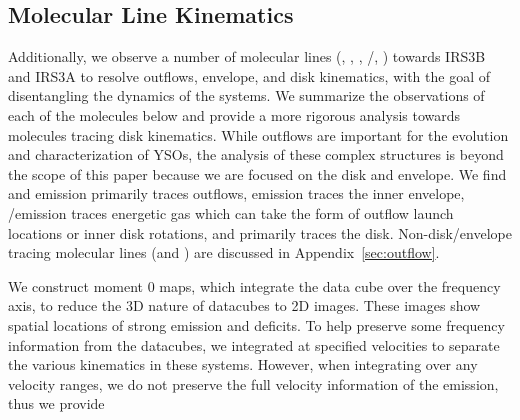 \documentclass[twocolumn, 12pt, trackchanges]{aastex63}
\begin{document}
\subsection{Molecular Line Kinematics}\label{sec:kinematics}
Additionally, we observe a number of molecular lines (\co, \sio, \htcop, \htcn/\sot, \cso) towards IRS3B and IRS3A to resolve outflows, envelope, and disk kinematics, with the goal of disentangling the dynamics of the systems. We summarize the observations of each of the molecules below and provide a more rigorous analysis towards molecules tracing disk kinematics. While outflows are important for the evolution and characterization of YSOs, the analysis of these complex structures is beyond the scope of this paper because we are focused on the disk and envelope. We find \co\space and \sio\space emission primarily traces outflows, \htcop\space emission traces the inner envelope, \htcn/\sot\space emission traces energetic gas which can take the form of outflow launch locations or inner disk rotations, and \cso\space primarily traces the disk. Non-disk/envelope tracing molecular lines (\co\space and \sio) are discussed in Appendix~\ref{sec:outflow}.


We construct moment 0 maps, which integrate the data cube over the frequency axis, to reduce the 3D nature of datacubes to 2D images. These images show spatial locations of strong emission and deficits. To help preserve some frequency information from the datacubes, we integrated at specified velocities to separate the various kinematics in these systems. However, when integrating over any velocity ranges, we do not preserve the full velocity information of the emission, thus we provide 
\end{document}
